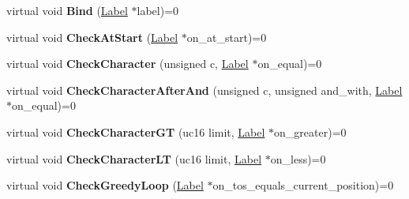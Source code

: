 \begin{DoxyCompactItemize}
\item 
virtual void {\bfseries Bind} (\hyperlink{classv8_1_1internal_1_1_label}{Label} $\ast$label)=0\hypertarget{classv8_1_1internal_1_1_reg_exp_macro_assembler_a391acf2eec9925c733a0d12349bdb165}{}\label{classv8_1_1internal_1_1_reg_exp_macro_assembler_a391acf2eec9925c733a0d12349bdb165}

\item 
virtual void {\bfseries Check\+At\+Start} (\hyperlink{classv8_1_1internal_1_1_label}{Label} $\ast$on\+\_\+at\+\_\+start)=0\hypertarget{classv8_1_1internal_1_1_reg_exp_macro_assembler_a5ecd7a813bf293dc9325c65840a2353b}{}\label{classv8_1_1internal_1_1_reg_exp_macro_assembler_a5ecd7a813bf293dc9325c65840a2353b}

\item 
virtual void {\bfseries Check\+Character} (unsigned c, \hyperlink{classv8_1_1internal_1_1_label}{Label} $\ast$on\+\_\+equal)=0\hypertarget{classv8_1_1internal_1_1_reg_exp_macro_assembler_a7d8a5cb9434ebe6a748b75bff7849eaa}{}\label{classv8_1_1internal_1_1_reg_exp_macro_assembler_a7d8a5cb9434ebe6a748b75bff7849eaa}

\item 
virtual void {\bfseries Check\+Character\+After\+And} (unsigned c, unsigned and\+\_\+with, \hyperlink{classv8_1_1internal_1_1_label}{Label} $\ast$on\+\_\+equal)=0\hypertarget{classv8_1_1internal_1_1_reg_exp_macro_assembler_a663101d81689ecee9375b9b2216b827b}{}\label{classv8_1_1internal_1_1_reg_exp_macro_assembler_a663101d81689ecee9375b9b2216b827b}

\item 
virtual void {\bfseries Check\+Character\+GT} (uc16 limit, \hyperlink{classv8_1_1internal_1_1_label}{Label} $\ast$on\+\_\+greater)=0\hypertarget{classv8_1_1internal_1_1_reg_exp_macro_assembler_a828b95b58f1f3173e5dcbd4268239bde}{}\label{classv8_1_1internal_1_1_reg_exp_macro_assembler_a828b95b58f1f3173e5dcbd4268239bde}

\item 
virtual void {\bfseries Check\+Character\+LT} (uc16 limit, \hyperlink{classv8_1_1internal_1_1_label}{Label} $\ast$on\+\_\+less)=0\hypertarget{classv8_1_1internal_1_1_reg_exp_macro_assembler_a6da6588d1142120898c35726d44ba28a}{}\label{classv8_1_1internal_1_1_reg_exp_macro_assembler_a6da6588d1142120898c35726d44ba28a}

\item 
virtual void {\bfseries Check\+Greedy\+Loop} (\hyperlink{classv8_1_1internal_1_1_label}{Label} $\ast$on\+\_\+tos\+\_\+equals\+\_\+current\+\_\+position)=0\hypertarget{classv8_1_1internal_1_1_reg_exp_macro_assembler_abc266b4989f0c084987f50f20f1f3e23}{}\label{classv8_1_1internal_1_1_reg_exp_macro_assembler_abc266b4989f0c084987f50f20f1f3e23}


\end{DoxyCompactItemize}
